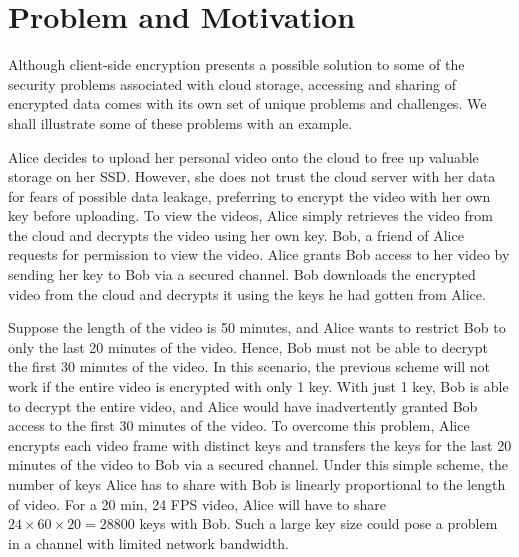 \documentclass[hyp,a4paper,12pt,openbib]{socreport}
\begin{document}

\section{Problem and Motivation}
\label{chap:1.1}
Although client-side encryption presents a possible solution to some of the security problems associated with cloud storage, accessing and sharing of encrypted data comes with its own set of unique problems and challenges. We shall illustrate some of these problems with an example.

Alice decides to upload her personal video onto the cloud to free up valuable storage on her SSD. However, she does not trust the cloud server with her data for fears of possible data leakage, preferring to encrypt the video with her own key before uploading. To view the videos, Alice simply retrieves the video from the cloud and decrypts the video using her own key. Bob, a friend of Alice requests for permission to view the video. Alice grants Bob access to her video by sending her key to Bob via a secured channel. Bob downloads the encrypted video from the cloud and decrypts it using the keys he had gotten from Alice.

Suppose the length of the video is 50 minutes, and Alice wants to restrict Bob to only the last 20 minutes of the video. Hence, Bob must not be able to decrypt the first 30 minutes of the video. In this scenario, the previous scheme will not work if the entire video is encrypted with only 1 key. With just 1 key, Bob is able to decrypt the entire video, and Alice would have inadvertently granted Bob access to the first 30 minutes of the video. To overcome this problem, Alice encrypts each video frame with distinct keys and transfers the keys for the last 20 minutes of the video to Bob via a secured channel. Under this simple scheme, the number of keys Alice has to share with Bob is linearly proportional to the length of video. For a 20 min, 24 FPS video, Alice will have to share $24 \times 60 \times 20 = 28800$ keys with Bob. Such a large key size could pose a problem in a channel with limited network bandwidth.
\end{document}
